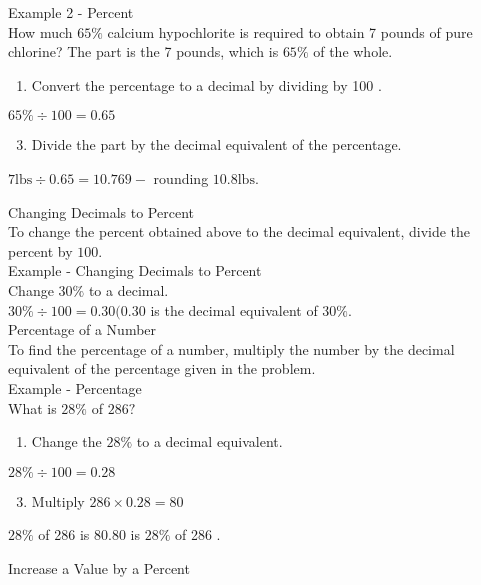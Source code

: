 Example 2 - Percent\\
How much $65 \%$ calcium hypochlorite is required to obtain 7 pounds of pure chlorine? The part is the 7 pounds, which is $65 \%$ of the whole.

\begin{enumerate}
  \item Convert the percentage to a decimal by dividing by 100 .
\end{enumerate}
$65 \% \div 100=0.65$

\begin{enumerate}
  \setcounter{enumi}{2}
  \item Divide the part by the decimal equivalent of the percentage.
\end{enumerate}
$7 \mathrm{lbs} \div 0.65=10.769-$ rounding $10.8 \mathrm{lbs}$.

Changing Decimals to Percent\\
To change the percent obtained above to the decimal equivalent, divide the percent by $100 .$\\

Example - Changing Decimals to Percent\\

Change $30 \%$ to a decimal.\\

$30 \% \div 100=0.30(0.30$ is the decimal equivalent of $30 \%$.\\

Percentage of a Number\\
To find the percentage of a number, multiply the number by the decimal equivalent of the percentage given in the problem.\\

Example - Percentage\\

What is $28 \%$ of $286 ?$\\

\begin{enumerate}
  \item Change the $28 \%$ to a decimal equivalent.
\end{enumerate}
$28 \% \div 100=0.28$

\begin{enumerate}
  \setcounter{enumi}{2}
  \item Multiply $286 \times 0.28=80$
\end{enumerate}
$28 \%$ of 286 is $80.80$ is $28 \%$ of 286 .

Increase a Value by a Percent\\

